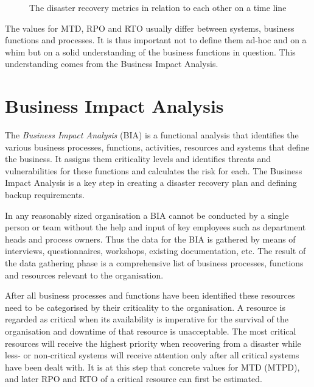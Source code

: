 \documentclass[a4paper,11pt,onecolumn]{scrartcl}
\begin{document}
\begin{figure}[t]
	\begin{center}
		\begin{scriptsize}
			\def\svgwidth{\textwidth}
			
		\end{scriptsize}
	\end{center}
	\caption{The disaster recovery metrics in relation to each other on
		a time line}
	\label{fig:mtd_all}
\end{figure}

The values for MTD, RPO and RTO usually differ between systems,
business functions and processes. It is thus important not to define
them ad-hoc and on a whim but on a solid understanding of the business
functions in question. This understanding comes from the Business Impact
Analysis.

\section{Business Impact Analysis}

The \emph{Business Impact Analysis} (BIA) is a functional analysis that
identifies the various business processes, functions, activities,
resources and systems that define the business. It assigns them
criticality levels and identifies threats and vulnerabilities for these
functions and calculates the risk for each. The Business Impact Analysis
is a key step in creating a disaster recovery plan and defining backup
requirements.

In any reasonably sized organisation a BIA cannot be conducted by a
single person or team without the help and input of key employees such
as department heads and process owners. Thus the data for the BIA is
gathered by means of interviews, questionnaires, workshops, existing
documentation, etc. The result of the data gathering phase is a
comprehensive list of business processes, functions and resources
relevant to the organisation.

After all business processes and functions have been identified these
resources need to be categorised by their criticality to the
organisation. A resource is regarded as critical when its availability
is imperative for the survival of the organisation and downtime of that
resource is unacceptable. The most critical resources will receive the
highest priority when recovering from a disaster while less- or
non-critical systems will receive attention only after all critical
systems have been dealt with. It is at this step that concrete values
for MTD (MTPD), and later RPO and RTO of a critical resource can first
be estimated.
\end{document}
